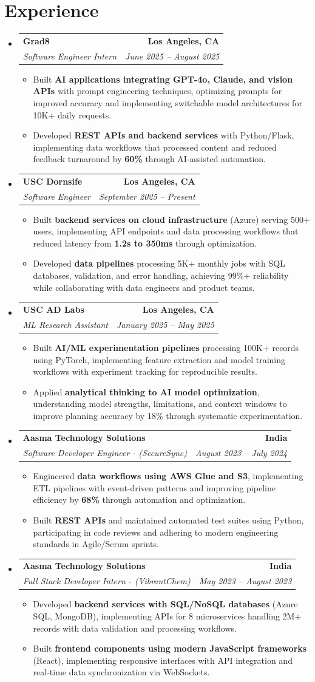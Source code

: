 \documentclass[letterpaper,10pt]{article}
\makeatletter
\newcommand{\resumeItem}[1]{\item\small{{#1 \vspace{-2pt}}}}
\newcommand{\resumeSubheading}[4]{\vspace{-1pt}\item\begin{tabular*}{1.0\textwidth}[t]{l@{\extracolsep{\fill}}r}\textbf{#1} & \textbf{\small #2} \\\textit{\small#3} & \textit{\small #4} \\\end{tabular*}\vspace{-2pt}}
\newcommand{\resumeSubHeadingListStart}{\begin{itemize}[leftmargin=0.0in, label={}]}
\newcommand{\resumeSubHeadingListEnd}{\end{itemize}}
\newcommand{\resumeItemListStart}{\begin{itemize}[leftmargin=0.15in,label=\textbullet,itemsep=2pt,topsep=0pt,parsep=0pt,partopsep=0pt]}
\newcommand{\resumeItemListEnd}{\end{itemize}\vspace{-4pt}}
\makeatother
\begin{document}
\section{Experience}
\resumeSubHeadingListStart
\resumeSubheading{Grad8}{Los Angeles, CA}{Software Engineer Intern}{June 2025 -- August 2025}
\resumeItemListStart
\resumeItem{Built \textbf{AI applications integrating GPT-4o, Claude, and vision APIs} with prompt engineering techniques, optimizing prompts for improved accuracy and implementing switchable model architectures for 10K+ daily requests.}
\resumeItem{Developed \textbf{REST APIs and backend services} with Python/Flask, implementing data workflows that processed content and reduced feedback turnaround by \textbf{60\%} through AI-assisted automation.}
\resumeItemListEnd
\resumeSubheading{USC Dornsife}{Los Angeles, CA}{Software Engineer}{September 2025 -- Present}
\resumeItemListStart
\resumeItem{Built \textbf{backend services on cloud infrastructure} (Azure) serving 500+ users, implementing API endpoints and data processing workflows that reduced latency from \textbf{1.2s to 350ms} through optimization.}
\resumeItem{Developed \textbf{data pipelines} processing 5K+ monthly jobs with SQL databases, validation, and error handling, achieving 99\%+ reliability while collaborating with data engineers and product teams.}
\resumeItemListEnd
\resumeSubheading{USC AD Labs}{Los Angeles, CA}{ML Research Assistant}{January 2025 -- May 2025}
\resumeItemListStart
\resumeItem{Built \textbf{AI/ML experimentation pipelines} processing 100K+ records using PyTorch, implementing feature extraction and model training workflows with experiment tracking for reproducible results.}
\resumeItem{Applied \textbf{analytical thinking to AI model optimization}, understanding model strengths, limitations, and context windows to improve planning accuracy by 18\% through systematic experimentation.}
\resumeItemListEnd
\resumeSubheading{Aasma Technology Solutions}{India}{Software Developer Engineer - (SecureSync)}{August 2023 -- July 2024}
\resumeItemListStart
\resumeItem{Engineered \textbf{data workflows using AWS Glue and S3}, implementing ETL pipelines with event-driven patterns and improving pipeline efficiency by \textbf{68\%} through automation and optimization.}
\resumeItem{Built \textbf{REST APIs} and maintained automated test suites using Python, participating in code reviews and adhering to modern engineering standards in Agile/Scrum sprints.}
\resumeItemListEnd
\resumeSubheading{Aasma Technology Solutions}{India}{Full Stack Developer Intern - (VibrantChem)}{May 2023 -- August 2023}
\resumeItemListStart
\resumeItem{Developed \textbf{backend services with SQL/NoSQL databases} (Azure SQL, MongoDB), implementing APIs for 8 microservices handling 2M+ records with data validation and processing workflows.}
\resumeItem{Built \textbf{frontend components using modern JavaScript frameworks} (React), implementing responsive interfaces with API integration and real-time data synchronization via WebSockets.}
\resumeItemListEnd
\resumeSubHeadingListEnd
\vspace{-14pt}
\end{document}
